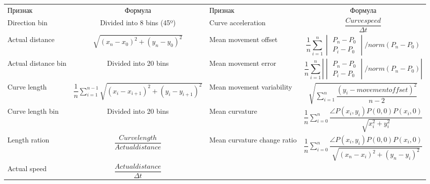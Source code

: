 \documentclass[12pt]{article}
\begin{document}
    \begin{table}[h]
        \centering
        \footnotesize
        \renewcommand{\arraystretch}{1.5}
        \renewcommand{\tabcolsep}{1mm}
        \begin{tabular}[c]{ || m{20mm} | c || m{20mm} | c ||}
            \hhline{|t:==:t:==:t|} 
            Признак & Формула &  Признак &  Формула \\ [2mm]
            \hhline{|:==::==:|} 
            Direction bin & \centering Divided into 8 bins (45º) &
            Curve acceleration & {\centering $\dfrac{Curvespeed}{\Delta t}$} \\
            \hline
            Actual distance & {\centering $\sqrt{(x_n-x_0)^2 + (y_n-y_0)^2}$} &
            Mean movement offset & \begin{equation*} \dfrac{1}{n} \sum_{i=1}^{n} \begin{vmatrix} P_n - P_0 \\ P_i - P_0  \end{vmatrix} / norm(P_n - P_0) \end{equation*} \\
            \hline
            Actual distance bin & {\centering Divided into 20 bins} &
            Mean movement error & {\centering \begin{equation*} \dfrac{1}{n} \sum_{i=1}^{n} \left| \begin{vmatrix} P_n - P_0 \\ P_i - P_0  \end{vmatrix} / norm(P_n - P_0) \right| \end{equation*}} \\
            \hline
            Curve length & {\centering $\dfrac{1}{n} \sum_{i=1}^{n-1} \sqrt{(x_i-x_{i+1})^2 + (y_i-y_{i+1})^2}$} &
            Mean movement variability & {\centering $\sqrt{\sum_{i=1}^{n} \dfrac{(y_i - movementoffset)^2}{n-2}}$} \\
            \hline
            Curve length bin & {\centering Divided into 20 bins} &
            Mean curvature & {\centering $\dfrac{1}{n} \sum_{i=0}^{n} \dfrac{\angle P(x_i, y_i)P(0,0)P(x_i, 0)}{\sqrt{x_{i}^2 + y_{i}^2}}$} \\
            \hline
            Length ration & {\centering $\dfrac{Curvelength}{Actualdistance}$} &
            Mean curvature change ratio & {\centering $\dfrac{1}{n} \sum_{i=0}^{n} \dfrac{\angle P(x_i, y_i)P(0,0)P(x_i, 0)}{\sqrt{(x_n-x_i)^2 + (y_n-y_i)^2}}$} \\
            \hline
            Actual speed & {\centering $\dfrac{Actualdistance}{\Delta t}$} &

\end{tabular}
\end{table}
\end{document}
